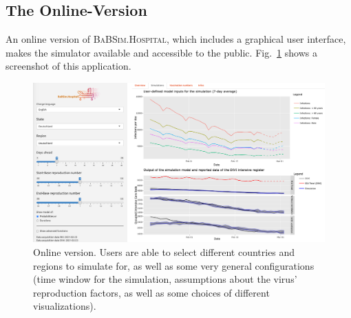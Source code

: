 \documentclass[conference]{IEEEtran}
\def\figref#1{Fig.~\ref{#1}}
\newcommand{\babsimhospital}{\textsc{BaBSim.Hospital}\xspace}
\begin{document}
\subsection{The Online-Version}\label{sec:online}
An online version of \babsimhospital, 
which includes a graphical user interface, 
makes the simulator available and accessible to the public.
\figref{fig:demo} shows a screenshot of this application.
\begin{figure}
    \centering
    \includegraphics[width=\linewidth]{demoFR.png}
    \caption{Online version. Users are able to select different countries and regions to simulate
for, as well as some very general configurations (time window for
the simulation, assumptions about the virus' reproduction factors, as well as some choices of different visualizations).}
\label{fig:demo}
\end{figure}
\end{document}
